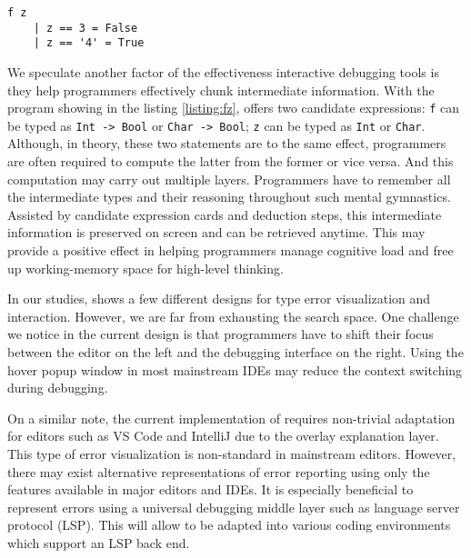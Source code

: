 

\begin{verbatim}
f z     
    | z == 3 = False
    | z == '4' = True
\end{verbatim}

We speculate another factor of the effectiveness \chameleon{} interactive debugging tools is they help programmers effectively chunk intermediate information. With the program showing in the listing \ref{listing:fz}, \chameleon{} offers two candidate expressions: \texttt{f} can be typed as \texttt{Int -> Bool} or \texttt{Char -> Bool}; \texttt{z} can be typed as \texttt{Int} or \texttt{Char}. Although, in theory, these two statements are to the same effect, programmers are often required to compute the latter from the former or vice versa. And this computation may carry out multiple layers. Programmers have to remember all the intermediate types and their reasoning throughout such mental gymnastics. Assisted by candidate expression cards and deduction steps, this intermediate information is preserved on screen and can be retrieved anytime. This may provide a positive effect in helping programmers manage cognitive load and free up working-memory space for high-level thinking.


In our studies, \chameleon{} shows a few different designs for type error visualization and interaction. However, we are far from exhausting the search space. One challenge we notice in the current design is that programmers have to shift their focus between the editor on the left and the \chameleon{} debugging interface on the right. Using the hover popup window in most mainstream IDEs may reduce the context switching during debugging.

On a similar note, the current implementation of \chameleon{} requires non-trivial adaptation for editors such as VS Code and IntelliJ due to the overlay explanation layer. This type of error visualization is non-standard in mainstream editors. However, there may exist alternative representations of \chameleon{} error reporting using only the features available in major editors and IDEs. It is especially beneficial to represent \chameleon{} errors using a universal debugging middle layer such as language server protocol (LSP). This will allow \chameleon{}  to be adapted into various coding environments which support an LSP back end.

